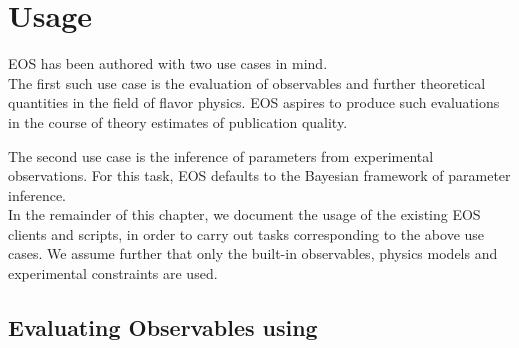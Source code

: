 
\chapter{Usage}
\label{ch:usage}

EOS has been authored with two use cases in mind.\\

The first such use case is the evaluation of observables and further theoretical
quantities in the field of flavor physics. EOS aspires to produce such evaluations
in the course of theory estimates of publication quality.

The second use case is the inference of parameters from experimental observations.
For this task, EOS defaults to the Bayesian framework of parameter inference.\\

In the remainder of this chapter, we document the usage of the existing
EOS clients and scripts, in order to carry out tasks corresponding to the above use cases.
We assume further that only the built-in observables, physics models and experimental
constraints are used.

\section{Evaluating Observables using }
\label{sec:usage:eos-evaluate}


